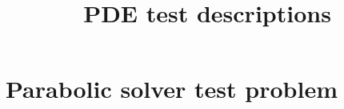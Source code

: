 \documentclass[11pt,letterpaper]{article}
\begin{document}
\setlength{\parindent}{0mm}
\setlength{\parskip}{0.4cm}




\title{PDE test descriptions}
\maketitle

\tableofcontents

\pagebreak


\section{Parabolic solver test problem}
\end{document}
